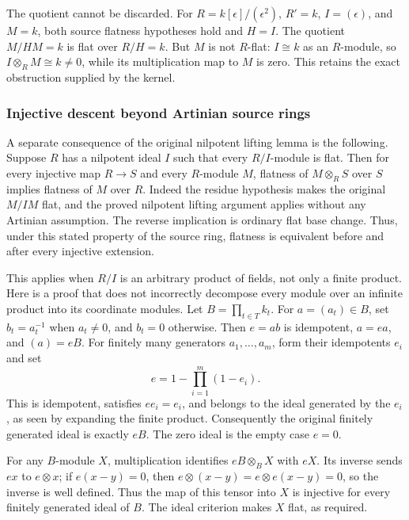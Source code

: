 The quotient cannot be discarded. For \(R=k[\epsilon]/(\epsilon^2)\), \(R'=k\), \(I=(\epsilon)\), and \(M=k\), both source flatness hypotheses hold and \(H=I\). The quotient \(M/HM=k\) is flat over \(R/H=k\). But \(M\) is not \(R\)-flat: \(I\cong k\) as an \(R\)-module, so \(I\otimes_RM\cong k\ne0\), while its multiplication map to \(M\) is zero. This retains the exact obstruction supplied by the kernel.

\subsubsection{Injective descent beyond Artinian source rings}\label{injective-descent-beyond-artinian-source-rings}

A separate consequence of the original nilpotent lifting lemma is the following. Suppose \(R\) has a nilpotent ideal \(I\) such that every \(R/I\)-module is flat. Then for every injective map \(R\to S\) and every \(R\)-module \(M\), flatness of \(M\otimes_RS\) over \(S\) implies flatness of \(M\) over \(R\). Indeed the residue hypothesis makes the original \(M/IM\) flat, and the proved nilpotent lifting argument applies without any Artinian assumption. The reverse implication is ordinary flat base change. Thus, under this stated property of the source ring, flatness is equivalent before and after every injective extension.

This applies when \(R/I\) is an arbitrary product of fields, not only a finite product. Here is a proof that does not incorrectly decompose every module over an infinite product into its coordinate modules. Let \(B=\prod_{t\in T}k_t\). For \(a=(a_t)\in B\), set \(b_t=a_t^{-1}\) when \(a_t\ne0\), and \(b_t=0\) otherwise. Then \(e=ab\) is idempotent, \(a=ea\), and \((a)=eB\). For finitely many generators \(a_1,\ldots,a_m\), form their idempotents \(e_i\) and set \[
e=1-\prod_{i=1}^m(1-e_i).
\] This is idempotent, satisfies \(ee_i=e_i\), and belongs to the ideal generated by the \(e_i\), as seen by expanding the finite product. Consequently the original finitely generated ideal is exactly \(eB\). The zero ideal is the empty case \(e=0\).

For any \(B\)-module \(X\), multiplication identifies \(eB\otimes_BX\) with \(eX\). Its inverse sends \(ex\) to \(e\otimes x\); if \(e(x-y)=0\), then \(e\otimes(x-y)=e\otimes e(x-y)=0\), so the inverse is well defined. Thus the map of this tensor into \(X\) is injective for every finitely generated ideal of \(B\). The ideal criterion makes \(X\) flat, as required.


